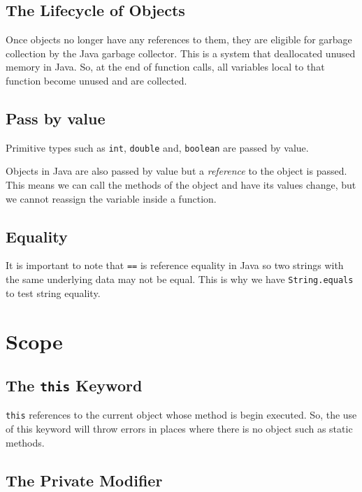 \documentclass[a4paper, 12pt, twoside]{article}
\begin{document}
\subsection{The Lifecycle of Objects}

Once objects no longer have any references to them, they are
eligible for garbage collection by the Java garbage collector.
This is a system that deallocated unused memory in Java. So,
at the end of function calls, all variables local to that function
become unused and are collected.

\subsection{Pass by value}

Primitive types such as \texttt{int}, \texttt{double} and, 
\texttt{boolean} are passed by value.

\vspace{\baselineskip}

Objects in Java are also passed by value but a \textit{reference}
to the object is passed. This means we can call the methods of the
object and have its values change, but we cannot reassign the
variable inside a function.

\subsection{Equality}

It is important to note that \texttt{==} is reference equality
in Java so two strings with the same underlying data may not
be equal. This is why we have \texttt{String.equals} to test
string equality.

\newpage

\section{Scope}

\subsection{The \texttt{this} Keyword}

\texttt{this} references to the current object whose method
is begin executed. So, the use of this keyword will throw
errors in places where there is no object such as static methods.

\subsection{The Private Modifier}
\end{document}
